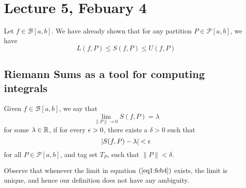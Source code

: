 \chapter*{Lecture 5, Febuary 4}
\setcounter{chapter}{5}
\setcounter{section}{0}

Let $f \in \mathcal{B}[a,b]$. We have already shown that for any partition $P \in \mathcal{P}[a,b]$, we have 
\begin{equation}\label{eq:LSU}
    L(f,P) \leq S(f,P) \leq U(f,P) 
\end{equation}

\section{Riemann Sums as a tool for computing integrals}

\begin{defn}
    Given $f \in \mathcal{B}[a,b]$, we say that 
    \begin{equation}\label{eq1:feb4}
        \lim_{\|P\|\to 0} S(f,P) = \lambda 
    \end{equation}
    for some $\lambda \in \mathbb{R}$, if for every $\epsilon > 0$, there exists a $\delta > 0$ such that 
    \[ |S(f,P) - \lambda| < \epsilon \]
    for all $P \in \mathcal{P}[a,b]$, and tag set $T_P$, such that $\|P\| < \delta$.
\end{defn}

Observe that whenever the limit in equation $(\ref{eq1:feb4})$ exists, the limit is unique, and hence our definition does not have any ambiguity. 

